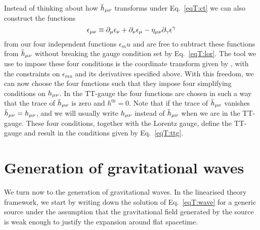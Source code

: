 Instead of thinking about how $\bar{h}_{\mu\nu}$ transforms under Eq.~\ref{eqT:ct}
we can also construct the functions 
\begin{equation}
\epsilon_{\mu\nu} \equiv \partial_{\mu} \epsilon_{\nu} + \partial_{\nu} \epsilon_{\mu} - \eta_{\mu\nu}\partial_{\gamma} \epsilon^{\gamma}
\end{equation}
from our four independent functions $\epsilon_mu$ and are free to subtract these functions from $\bar{h}_{\mu\nu}$ without breaking the gauge condition set by Eq.~\ref{eqT:lor}.
The tool we use to impose these four conditions is the coordinate transform given by , with the constraints
on $\epsilon_{mu}$ and its derivatives specified above.
With this freedom, we can now choose the four functions such that they impose four simplifying conditions on  $h_{\mu\nu}$.
In the TT-gauge the four functions are chosen in such a way that the trace of $\bar{h}_{\mu\nu}$ is zero and
 $h^{0i} = 0$. Note that if the trace of $\bar{h}_{\mu\nu}$ vanishes $\bar{h}_{\mu\nu} = h_{\mu\nu}$, and
we will usually write $h_{\mu\nu}$ instead of $\bar{h}_{\mu\nu}$ when we are in the TT-gauge.
These four conditions, together with the Lorentz gauge, define the TT-gauge and result in the
conditions given by Eq.~\ref{eqT:ttg}.

\section{Generation of gravitational waves}
We turn now to the generation of gravitational waves. In the linearised theory framework,
we start by writing down the solution of Eq.~\ref{eqT:wave} for a generic source under the assumption that the gravitational field generated by the source is weak enough to justify the expansion around flat spacetime. 

